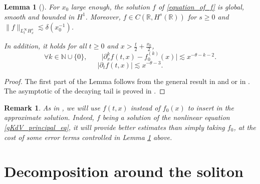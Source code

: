 \documentclass[16pt,english, oneside,reqno]{smfart}
\newcommand{\NN}{\mathbb{N}}
\newcommand{\RR}{\mathbb{R}}
\newtheorem{remark}{Remark}[section]
\newtheorem{lemma}[theorem]{Lemma}
\begin{document}
\begin{lemma}[\cite{MMPIII}]\label{lemma_on_the_decaying_tail}
    For $x_0$ large enough, the solution $f$ of \eqref{equation_of_f} is global, smooth and bounded in $H^1$.
    Moreover, $f\in C(\RR,H^s(\RR))$ for $s\geq 0$ and $\|f\|_{L^{\infty}_{t}H^s_x} \lesssim \delta(x_0^{-1})$.
    
    In addition, it holds for all $t\geq0$ and $x > \frac{t}{2}+\frac{x_0}{2}$,
    \begin{equation}
        \forall k \in \NN\cup\{0\}, \qquad \lvert \partial^k_x f(t,x) - f_0^{(k)}(x)\rvert \lesssim x^{-\theta-k-2}.
    \end{equation}
    \begin{equation}
        \lvert \partial_t f(t,x) \rvert \lesssim x^{-\theta-3}.
    \end{equation}
\end{lemma}
\begin{proof}
    The first part of the Lemma follows from the general result in \cite[Theorem 2.8]{KPV93} and \cite[Corollary 2.9]{KPV93} or in \cite[Theorem 7.2]{Linares-Ponce}.  The asymptotic of the decaying tail is proved in \cite[Lemma 2.3]{MMPIII}.
\end{proof}
\begin{remark}
As in \cite{MMPIII}, we will use $f(t,x)$ instead of $f_0(x)$ to insert in 
the approximate solution. Indeed, $f$ being a solution of the nonlinear equation \eqref{gKdV_principal_eq}, it will provide better estimates than
simply taking $f_0$, at the cost of some error terms controlled in Lemma \ref{lemma_on_the_decaying_tail} above.
\end{remark}


\section{Decomposition around the soliton}\label{section_decomposition} 
\end{document}
